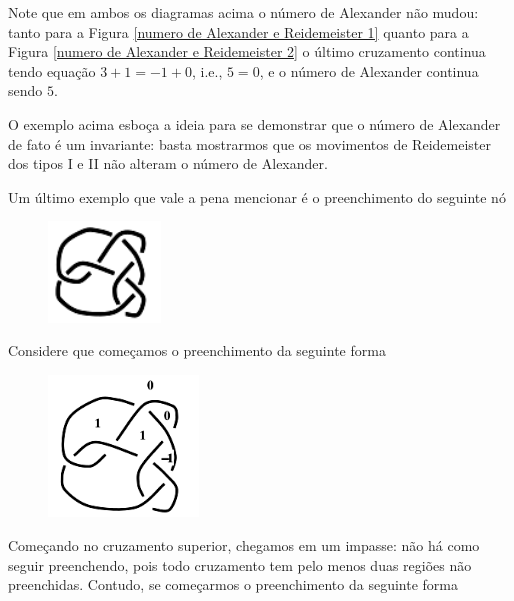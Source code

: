 \documentclass[a4paper,portuguese,11pt,twoside, leqno]{book}
\theoremstyle{definition}
\begin{document}
	\par\vspace{0.3cm} Note que em ambos os diagramas acima o número de Alexander não mudou: tanto para a Figura \eqref{numero de Alexander e Reidemeister 1} quanto para a Figura \eqref{numero de Alexander e Reidemeister 2} o último cruzamento continua tendo equação $3+1=-1+0$, i.e., $5=0$, e o número de Alexander continua sendo $5$.
	\par\vspace{0.3cm} O exemplo acima esboça a ideia para se demonstrar que o número de Alexander de fato é um invariante: basta mostrarmos que os movimentos de Reidemeister dos tipos I e II não alteram o número de Alexander.
	\par\vspace{0.3cm} Um último exemplo que vale a pena mencionar é o preenchimento do seguinte nó
	\begin{figure}[H]
		\begin{center}
			\includegraphics[width=3cm]{no_exemplo_travado.png}
		\end{center}
	\end{figure}
	\par\vspace{0.3cm} Considere que começamos o preenchimento da seguinte forma
	\begin{figure}[H]
		\begin{center}
			\includegraphics[width=4cm]{no_preenchimento_incompleto.png}
		\end{center}
	\end{figure}
	\par\vspace{0.3cm} Começando no cruzamento superior, chegamos em um impasse: não há como seguir preenchendo, pois todo cruzamento tem pelo menos duas regiões não preenchidas. Contudo, se começarmos o preenchimento da seguinte forma
\end{document}
